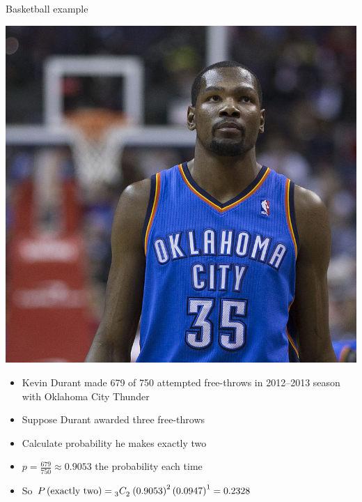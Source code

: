 \documentclass[xcolor=dvipsnames]{beamer}
\theoremstyle{definition}
\newcommand\ncr[2]{\tensor[_{#1}]C{_{#2}}}
\begin{document}
\begin{frame}{Basketball example}
\begin{multicols}{2}
\includegraphics[scale=.75]{KevinDurant}
\begin{itemize}
\item Kevin Durant made 679 of 750 attempted free-throws
in 2012--2013 season with Oklahoma City Thunder
\item Suppose Durant awarded three free-throws
\item Calculate probability he makes exactly two
\item $p=\frac{679}{750}\approx 0.9053$ the probability
each time
\item So $P\left(\text{exactly two}\right)
=\ncr{3}{2}\left(0.9053\right)^2\left(0.0947\right)^1=0.2328$
\end{itemize}
\end{multicols}
\end{frame}
\end{document}
